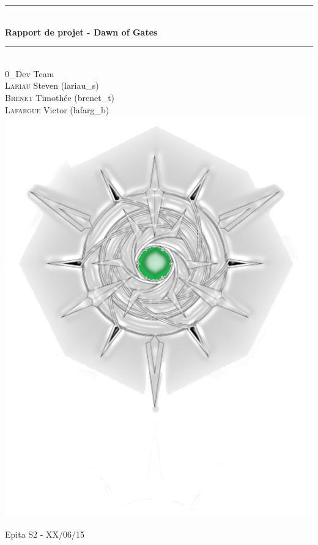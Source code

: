\documentclass[12pt]{article}
\newcommand{\HRule}{\rule{\linewidth}{0.5mm}}
\begin{document}
\begin{titlepage}
	\begin{center}

		\HRule \\[0.4cm]
		{ \huge \bfseries Rapport de projet - Dawn of Gates\\[0.4cm] }
		\HRule \\[2cm]


		\large \textsc 0\_Dev Team\\
		\textsc{Lariau} Steven (lariau\_s) \\
		\textsc{Brenet} Timothée (brenet\_t)\\
		\textsc{Lafargue} Victor (lafarg\_b)\\

		\includegraphics[scale=0.45]{logo2.png}
		
		\large \textsc Epita S2 - XX/06/15

	\end{center}
\end{titlepage}
\end{document}
